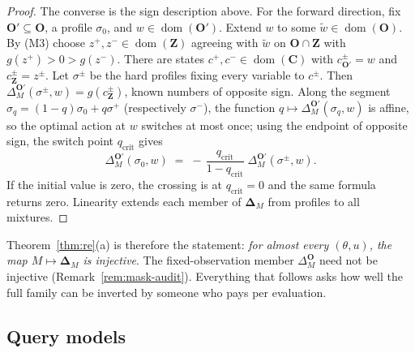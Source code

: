 \documentclass[11pt]{amsart}
\theoremstyle{plain}
\theoremstyle{definition}
\DeclareMathOperator{\dom}{dom}
\newcommand{\bC}{\mathbf{C}}
\newcommand{\bO}{\mathbf{O}}
\newcommand{\bZ}{\mathbf{Z}}
\begin{document}
\begin{proof}
The converse is the sign description above. For the forward direction, fix $\bO'\subseteq\bO$, a profile $\sigma_0$, and $w\in\dom(\bO')$. Extend $w$ to some $\widetilde w\in\dom(\bO)$. By (M3) choose $z^+,z^-\in\dom(\bZ)$ agreeing with $\widetilde w$ on $\bO\cap\bZ$ with $g(z^+)>0>g(z^-)$. There are states $c^+,c^-\in\dom(\bC)$ with $c^\pm_{\bO'}=w$ and $c^\pm_\bZ=z^\pm$. Let $\sigma^\pm$ be the hard profiles fixing every variable to $c^\pm$. Then $\Delta_M^{\bO'}(\sigma^\pm,w)=g(c^\pm_\bZ)$, known numbers of opposite sign. Along the segment $\sigma_q=(1-q)\sigma_0+q\sigma^+$ (respectively $\sigma^-$), the function $q\mapsto\Delta_M^{\bO'}(\sigma_q,w)$ is affine, so the optimal action at $w$ switches at most once; using the endpoint of opposite sign, the switch point $q_{\mathrm{crit}}$ gives
\[
   \Delta_M^{\bO'}(\sigma_0,w)\;=\;-\,\frac{q_{\mathrm{crit}}}{1-q_{\mathrm{crit}}}\;\Delta_M^{\bO'}(\sigma^\pm,w).
\]
If the initial value is zero, the crossing is at $q_{\mathrm{crit}}=0$ and the same formula returns zero. Linearity extends each member of $\boldsymbol\Delta_M$ from profiles to all mixtures.
\end{proof}

Theorem~\ref{thm:re}(a) is therefore the statement: \emph{for almost every $(\theta,u)$, the map $M\mapsto\boldsymbol\Delta_M$ is injective}. The fixed-observation member $\Delta_M^{\bO}$ need not be injective (Remark~\ref{rem:mask-audit}). Everything that follows asks how well the full family can be inverted by someone who pays per evaluation.

\subsection{Query models}\label{subsec:queries}
\end{document}
